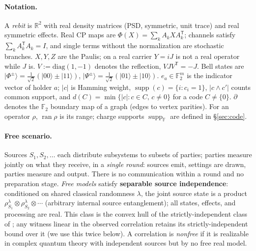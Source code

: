 \documentclass[11pt]{article}
\theoremstyle{plain}
\theoremstyle{definition}
\theoremstyle{remark}
\theoremstyle{plain}
\newcommand{\R}{\mathbb{R}}
\newcommand{\F}{\mathbb{F}}
\newcommand{\suppop}{\operatorname{ran}}
\newcommand{\suppF}{\operatorname{supp}_{\F}}
\newcommand{\supp}{\operatorname{supp}}
\begin{document}
\paragraph{Notation.} A \emph{rebit} is $\R^2$ with real density
matrices (PSD, symmetric, unit trace) and real symmetric effects.
Real CP maps are $\Phi(X) = \sum_k A_kXA_k^{\mathsf T}$; channels
satisfy $\sum_kA_k^{\mathsf T}A_k = I$, and single terms without
the normalization are stochastic branches. $X, Y, Z$ are the
Paulis; on a real carrier $Y = iJ$ is not a real operator while
$J$ is. $V := \mathrm{diag}(1,-1)$ denotes the reflection,
$VJV^{\mathsf T} = -J$. Bell states are
$|\Phi^\pm\rangle = \tfrac1{\sqrt2}(|00\rangle\pm|11\rangle)$,
$|\Psi^\pm\rangle = \tfrac1{\sqrt2}(|01\rangle\pm|10\rangle)$.
$e_a\in\F_2^m$ is the indicator vector of holder $a$; $|c|$ is
Hamming weight, $\supp(c) = \{i : c_i = 1\}$, $|c\wedge c'|$
counts common support, and $d(C) = \min\{|c| : c\in C,\,c\neq0\}$
for a code $C\neq\{0\}$. $\partial$ denotes the $\F_2$ boundary
map of a graph (edges to vertex parities). For an operator $\rho$,
$\suppop\rho$ is its range; charge supports $\suppF$ are defined
in \S\ref{sec:code}.

\paragraph{Free scenario.} Sources $S_1,S_2,\dots$ each distribute
subsystems to subsets of parties; parties measure jointly on what
they receive, in a \emph{single round}: sources emit, settings are
drawn, parties measure and output. There is no communication
within a round and no preparation stage. \emph{Free models}
satisfy \textbf{separable source independence}: conditioned on
shared classical randomness $\lambda$, the joint source state is a
product $\rho_{S_1}^\lambda\otimes\rho_{S_2}^\lambda\otimes\cdots$
(arbitrary internal source entanglement); all states, effects, and
processing are real. This class is the convex hull of the
strictly-independent class of \cite{renou2021}; any witness linear
in the observed correlation retains its strictly-independent bound
over it (we use this twice below). A correlation is \emph{nonfree}
if it is realizable in complex quantum theory with independent
sources but by no free real model.
\end{document}
